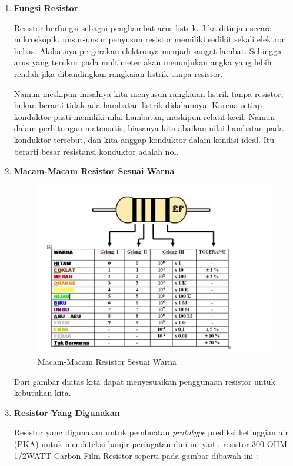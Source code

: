 \begin{enumerate}
\item \textbf{Fungsi Resistor}\\
\par Resistor berfungsi sebagai penghambat arus listrik. Jika ditinjau secara mikroskopik, unsur-unsur penyusun resistor memiliki sedikit sekali elektron bebas. Akibatnya pergerakan elektronya menjadi sangat lambat. Sehingga arus yang terukur pada multimeter akan menunjukan angka yang lebih rendah jika dibandingkan rangkaian listrik tanpa resistor.

\par Namun meskipun misalnya kita menyusun rangkaian listrik tanpa resistor, bukan berarti tidak ada hambatan listrik didalamnya. Karena setiap konduktor pasti memiliki nilai hambatan, meskipun relatif kecil. Namun dalam perhitungan matematis, biasanya kita abaikan nilai hambatan pada konduktor tersebut, dan kita anggap konduktor dalam kondisi ideal. Itu berarti besar resistansi konduktor adalah nol.

\item \textbf{Macam-Macam Resistor Sesuai Warna}\\
\begin{figure}[H]
\centering
\includegraphics[width=1\textwidth]{figures/resistor2.png}
\caption{Macam-Macam Resistor Sesuai Warna}
\label{print}
\end{figure}

Dari gambar diatas kita dapat menyesuaikan penggunaan resistor untuk kebutuhan kita. 

\item \textbf{Resistor Yang Digunakan}
\par Resistor yang digunakan untuk pembuatan \textit{prototype} prediksi ketinggian air (PKA) untuk mendeteksi banjir peringatan dini ini yaitu resistor 300 OHM 1/2WATT Carbon Film Resistor seperti pada gambar dibawah ini :


\end{enumerate}
